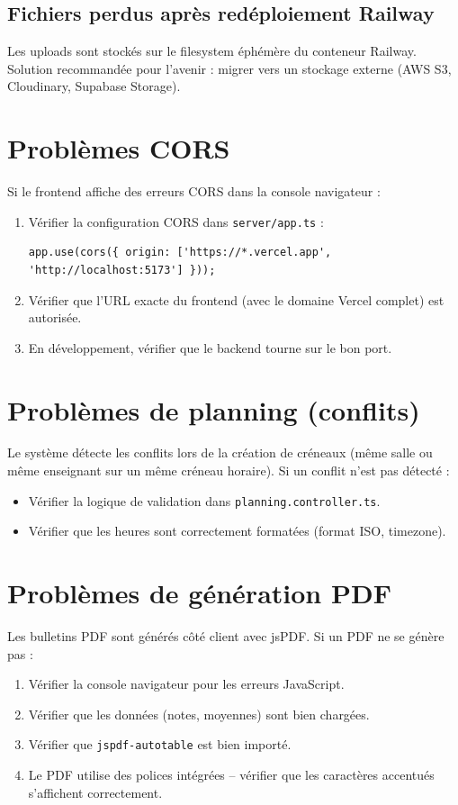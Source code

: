 \documentclass[12pt,a4paper]{report}
\begin{document}
\subsection{Fichiers perdus après redéploiement Railway}
Les uploads sont stockés sur le filesystem éphémère du conteneur Railway. Solution recommandée pour l'avenir : migrer vers un stockage externe (AWS S3, Cloudinary, Supabase Storage).

\section{Problèmes CORS}

Si le frontend affiche des erreurs CORS dans la console navigateur :
\begin{enumerate}
    \item Vérifier la configuration CORS dans \texttt{server/app.ts} :
\begin{lstlisting}
app.use(cors({ origin: ['https://*.vercel.app', 'http://localhost:5173'] }));
\end{lstlisting}
    \item Vérifier que l'URL exacte du frontend (avec le domaine Vercel complet) est autorisée.
    \item En développement, vérifier que le backend tourne sur le bon port.
\end{enumerate}

\section{Problèmes de planning (conflits)}

Le système détecte les conflits lors de la création de créneaux (même salle ou même enseignant sur un même créneau horaire). Si un conflit n'est pas détecté :
\begin{itemize}
    \item Vérifier la logique de validation dans \texttt{planning.controller.ts}.
    \item Vérifier que les heures sont correctement formatées (format ISO, timezone).
\end{itemize}

\section{Problèmes de génération PDF}

Les bulletins PDF sont générés côté client avec jsPDF. Si un PDF ne se génère pas :
\begin{enumerate}
    \item Vérifier la console navigateur pour les erreurs JavaScript.
    \item Vérifier que les données (notes, moyennes) sont bien chargées.
    \item Vérifier que \texttt{jspdf-autotable} est bien importé.
    \item Le PDF utilise des polices intégrées -- vérifier que les caractères accentués s'affichent correctement.
\end{enumerate}
\end{document}
